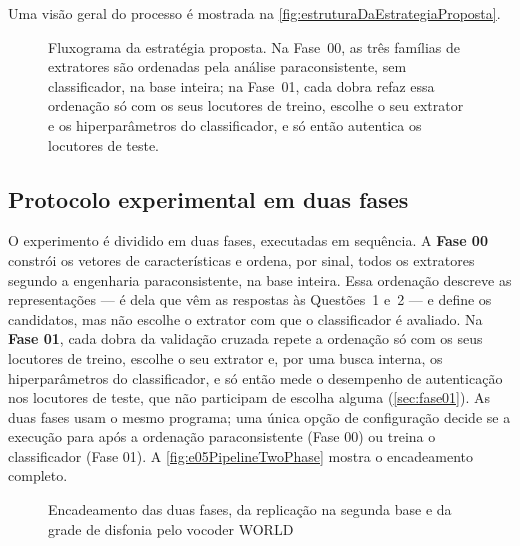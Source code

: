 		\par Uma visão geral do processo é mostrada na \autoref{fig:estruturaDaEstrategiaProposta}.
		
		\begin{figure}[h]
			\centering
			\caption[Estratégia proposta]{Fluxograma da estratégia proposta. Na Fase~00, as três famílias de extratores são ordenadas pela análise paraconsistente, sem classificador, na base inteira; na Fase~01, cada dobra refaz essa ordenação só com os seus locutores de treino, escolhe o seu extrator e os hiperparâmetros do classificador, e só então autentica os locutores de teste.}
			\resizebox{\linewidth}{!}{}
			\label{fig:estruturaDaEstrategiaProposta}
		\end{figure}

		\subsection{Protocolo experimental em duas fases}
			\label{sec:protocoloDuasFases}

			\par O experimento é dividido em duas fases, executadas em sequência. A \textbf{Fase 00} constrói os vetores de características e ordena, por sinal, todos os extratores segundo a engenharia paraconsistente, na base inteira. Essa ordenação descreve as representações --- é dela que vêm as respostas às Questões~1 e~2 --- e define os candidatos, mas não escolhe o extrator com que o classificador é avaliado. Na \textbf{Fase 01}, cada dobra da validação cruzada repete a ordenação só com os seus locutores de treino, escolhe o seu extrator e, por uma busca interna, os hiperparâmetros do classificador, e só então mede o desempenho de autenticação nos locutores de teste, que não participam de escolha alguma (\autoref{sec:fase01}). As duas fases usam o mesmo programa; uma única opção de configuração decide se a execução para após a ordenação paraconsistente (Fase 00) ou treina o classificador (Fase 01). A \autoref{fig:e05PipelineTwoPhase} mostra o encadeamento completo.

			\begin{figure}[h]
				\centering
				\caption[Pipeline em duas fases]{Encadeamento das duas fases, da replicação na segunda base e da grade de disfonia pelo vocoder WORLD}
				\resizebox{\linewidth}{!}{}
				\label{fig:e05PipelineTwoPhase}
			\end{figure}

